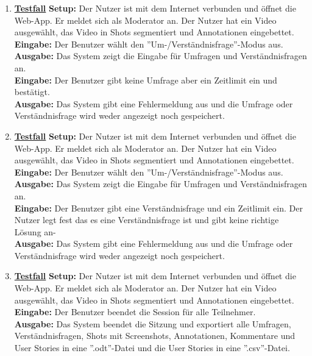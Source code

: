 \begin{enumerate}
	\item \underline{\textbf{Testfall}} \linebreak
	\textbf{Setup:} Der Nutzer ist mit dem Internet verbunden und öffnet die Web-App. Er meldet sich als Moderator an. Der Nutzer hat ein Video ausgewählt, das Video in Shots segmentiert und Annotationen eingebettet. \\
	\textbf{Eingabe:} Der Benutzer wählt den ''Um-/Verständnisfrage''-Modus aus. \\
	\textbf{Ausgabe:} Das System zeigt die Eingabe für Umfragen und Verständnisfragen an.\\ 
	\textbf{Eingabe:} Der Benutzer gibt keine Umfrage aber ein Zeitlimit ein und bestätigt.\\
	\textbf{Ausgabe:} Das System gibt eine Fehlermeldung aus und die Umfrage oder Verständnisfrage wird weder angezeigt noch gespeichert.
	
	\item \underline{\textbf{Testfall}} \linebreak
	\textbf{Setup:} Der Nutzer ist mit dem Internet verbunden und öffnet die Web-App. Er meldet sich als Moderator an. Der Nutzer hat ein Video ausgewählt, das Video in Shots segmentiert und Annotationen eingebettet. \\
	\textbf{Eingabe:} Der Benutzer wählt den ''Um-/Verständnisfrage''-Modus aus. \\
	\textbf{Ausgabe:} Das System zeigt die Eingabe für Umfragen und Verständnisfragen an.\\ 
	\textbf{Eingabe:} Der Benutzer gibt eine Verständnisfrage und ein Zeitlimit ein. Der Nutzer legt fest das es eine Verständnisfrage ist und gibt keine richtige Lösung an-\\
	\textbf{Ausgabe:} Das System gibt eine Fehlermeldung aus und die Umfrage oder Verständnisfrage wird weder angezeigt noch gespeichert.
	
	\item \underline{\textbf{Testfall}} \linebreak
	\textbf{Setup:} Der Nutzer ist mit dem Internet verbunden und öffnet die Web-App. Er meldet sich als Moderator an. Der Nutzer hat ein Video ausgewählt, das Video in Shots segmentiert und Annotationen eingebettet. \\
	\textbf{Eingabe:} Der Benutzer beendet die Session für alle Teilnehmer. \\
	\textbf{Ausgabe:} Das System beendet die Sitzung und exportiert alle Umfragen, Verständnisfragen, Shots mit Screenshots, Annotationen, Kommentare und User Stories in eine ''.odt''-Datei und die User Stories in eine ''.csv''-Datei.\\ 
	
\end{enumerate}
